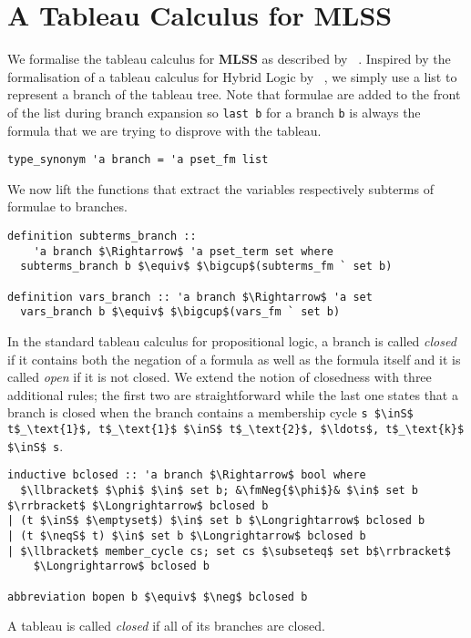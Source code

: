 \documentclass[sigplan,10pt,anonymous,review]{acmart}
\newcommand{\MLSS}{\textbf{MLSS}}
\newcommand{\inS}{\in_\text{s}}
\newcommand{\neqS}{{\not\approx}_\text{s}}
\newcommand{\fmNeg}[1]{$\boldsymbol{\neg}$ #1}
\begin{document}
\section{A Tableau Calculus for MLSS}
We formalise the tableau calculus for \MLSS{} as described by \citeauthor{new_fast_tableau}~\cite{new_fast_tableau}.
Inspired by the formalisation of a tableau calculus for Hybrid Logic by \citeauthor{hybrid_logic_afp}~\cite{hybrid_logic_afp}, we simply use a list to represent a branch of the tableau tree.
Note that formulae are added to the front of the list during branch expansion so \lstinline!last b! for a branch \lstinline!b! is always the formula that we are trying to disprove with the tableau. 
\begin{lstlisting}
type_synonym 'a branch = 'a pset_fm list
\end{lstlisting}
We now lift the functions that extract the variables respectively subterms of formulae to branches.
\begin{lstlisting}
definition subterms_branch ::
    'a branch $\Rightarrow$ 'a pset_term set where
  subterms_branch b $\equiv$ $\bigcup$(subterms_fm ` set b)

definition vars_branch :: 'a branch $\Rightarrow$ 'a set 
  vars_branch b $\equiv$ $\bigcup$(vars_fm ` set b)
\end{lstlisting}
In the standard tableau calculus for propositional logic, a branch is called \textit{closed} if it contains both the negation of a formula as well as the formula itself and it is called \textit{open} if it is not closed.
We extend the notion of closedness with three additional rules; the first two are straightforward while the last one states that a branch is closed when the branch contains a membership cycle \lstinline!s $\inS$ t$_\text{1}$, t$_\text{1}$ $\inS$ t$_\text{2}$, $\ldots$, t$_\text{k}$ $\inS$ s!.
\begin{lstlisting}
inductive bclosed :: 'a branch $\Rightarrow$ bool where
  $\llbracket$ $\phi$ $\in$ set b; &\fmNeg{$\phi$}& $\in$ set b $\rrbracket$ $\Longrightarrow$ bclosed b
| (t $\inS$ $\emptyset$) $\in$ set b $\Longrightarrow$ bclosed b
| (t $\neqS$ t) $\in$ set b $\Longrightarrow$ bclosed b
| $\llbracket$ member_cycle cs; set cs $\subseteq$ set b$\rrbracket$
    $\Longrightarrow$ bclosed b

abbreviation bopen b $\equiv$ $\neg$ bclosed b
\end{lstlisting}
A tableau is called \textit{closed} if all of its branches are closed.
\end{document}
